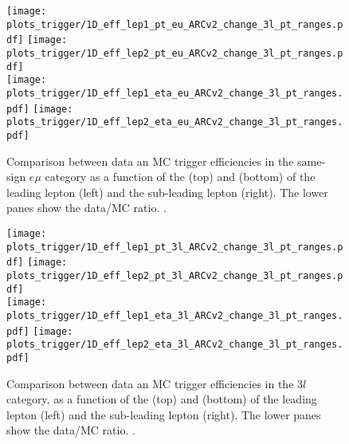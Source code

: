 \begin{figure}[htp]
\centering
\texttt{[image: plots\_trigger/1D\_eff\_lep1\_pt\_eu\_ARCv2\_change\_3l\_pt\_ranges.pdf]}
\texttt{[image: plots\_trigger/1D\_eff\_lep2\_pt\_eu\_ARCv2\_change\_3l\_pt\_ranges.pdf]} \\
\texttt{[image: plots\_trigger/1D\_eff\_lep1\_eta\_eu\_ARCv2\_change\_3l\_pt\_ranges.pdf]}
\texttt{[image: plots\_trigger/1D\_eff\_lep2\_eta\_eu\_ARCv2\_change\_3l\_pt\_ranges.pdf]}
\caption[Trigger efficiency for the $e\mu$ category]{Comparison between data an MC trigger efficiencies in the same-sign $e\mu$ category as a function of the \pt (top) and \etac (bottom) of the leading lepton (left) and the sub-leading lepton (right). The lower panes show the data/MC ratio. \cite{CMS_AN_2017-029}.}
\label{fig:trigeffsemu}
\end{figure}


\begin{figure}[htp]
\centering
\texttt{[image: plots\_trigger/1D\_eff\_lep1\_pt\_3l\_ARCv2\_change\_3l\_pt\_ranges.pdf]}
\texttt{[image: plots\_trigger/1D\_eff\_lep2\_pt\_3l\_ARCv2\_change\_3l\_pt\_ranges.pdf]} \\
\texttt{[image: plots\_trigger/1D\_eff\_lep1\_eta\_3l\_ARCv2\_change\_3l\_pt\_ranges.pdf]}
\texttt{[image: plots\_trigger/1D\_eff\_lep2\_eta\_3l\_ARCv2\_change\_3l\_pt\_ranges.pdf]}
\caption[Trigger efficiency for the $3l$ category]{Comparison between data an MC trigger efficiencies in the $3l$ category, as a function of the \pt (top) and \etac (bottom) of the leading lepton (left) and the sub-leading lepton (right). The lower panes show the data/MC ratio. \cite{CMS_AN_2017-029}.}
\label{fig:trigeffs3l}
\end{figure}

